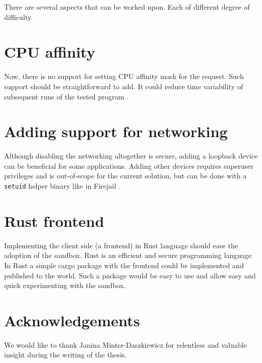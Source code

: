 \documentclass[en]{pracamgr}
\begin{document}
There are several aspects that can be worked upon. Each of different degree of difficulty.

\section{CPU affinity}

Now, there is no support for setting CPU affinity mask for the request. Such support should be straightforward to add. It could reduce time variability of subsequent runs of the tested program \cite{merry2010performance}.

\section{Adding support for networking}

Although disabling the networking altogether is secure, adding a loopback device can be beneficial for some applications. Adding other devices requires superuser privileges and is out-of-scope for the current solution, but can be done with a \texttt{setuid} helper binary like in Firejail \cite{netblue30/firejail}.

\section{Rust frontend}

Implementing the client side (a frontend) in Rust language should ease the adoption of the sandbox. Rust is an efficient and secure programming language. In Rust a simple cargo package with the frontend could be implemented and published to the world. Such a package would be easy to use and allow easy and quick experimenting with the sandbox.

\section{Acknowledgements}\label{chapter:conclusion}

We would like to thank Janina Minter-Daszkiewicz for relentless and valuable insight during the writing of the thesis.

\printbibliography
\end{document}
